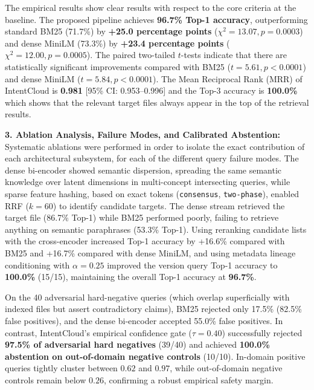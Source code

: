 \documentclass[a4paper,12pt]{article}
\begin{document}
The empirical results show clear results with respect to the core criteria at the baseline. The proposed pipeline achieves \textbf{96.7\% Top-1 accuracy}, outperforming standard BM25 (71.7\%) by \textbf{+25.0 percentage points} ($\chi^2 = 13.07, p = 0.0003$) and dense MiniLM (73.3\%) by \textbf{+23.4 percentage points} ($\chi^2 = 12.00, p = 0.0005$). The paired two-tailed $t$-tests indicate that there are statistically significant improvements compared with BM25 ($t = 5.61, p < 0.0001$) and dense MiniLM ($t = 5.84, p < 0.0001$). The Mean Reciprocal Rank (MRR) of IntentCloud is \textbf{0.981} [95\% CI: 0.953--0.996] and the Top-3 accuracy is \textbf{100.0\%} which shows that the relevant target files always appear in the top of the retrieval results.


\noindent\textbf{3. Ablation Analysis, Failure Modes, and Calibrated Abstention:}\\
Systematic ablations were performed in order to isolate the exact contribution of each architectural subsystem, for each of the different query failure modes. The dense bi-encoder showed semantic dispersion, spreading the same semantic knowledge over latent dimensions in multi-concept intersecting queries, while sparse feature hashing, based on exact tokens (\texttt{consensus}, \texttt{two-phase}), enabled RRF ($k=60$) to identify candidate targets. The dense stream retrieved the target file (86.7\% Top-1) while BM25 performed poorly, failing to retrieve anything on semantic paraphrases (53.3\% Top-1). Using reranking candidate lists with the cross-encoder increased Top-1 accuracy by +16.6\% compared with BM25 and +16.7\% compared with dense MiniLM, and using metadata lineage conditioning with $\alpha=0.25$ improved the version query Top-1 accuracy to \textbf{100.0\%} (15/15), maintaining the overall Top-1 accuracy at \textbf{96.7\%}.

On the 40 adversarial hard-negative queries (which overlap superficially with indexed files but assert contradictory claims), BM25 rejected only 17.5\% (82.5\% false positives), and the dense bi-encoder accepted 55.0\% false positives. In contrast, IntentCloud's empirical confidence gate ($\tau=0.40$) successfully rejected \textbf{97.5\% of adversarial hard negatives} (39/40) and achieved \textbf{100.0\% abstention on out-of-domain negative controls} (10/10). In-domain positive queries tightly cluster between $0.62$ and $0.97$, while out-of-domain negative controls remain below $0.26$, confirming a robust empirical safety margin.
\end{document}
